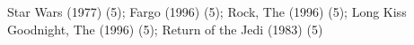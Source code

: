 Star Wars (1977) (5); Fargo (1996) (5); Rock, The (1996) (5); Long Kiss Goodnight, The (1996) (5); Return of the Jedi (1983) (5)